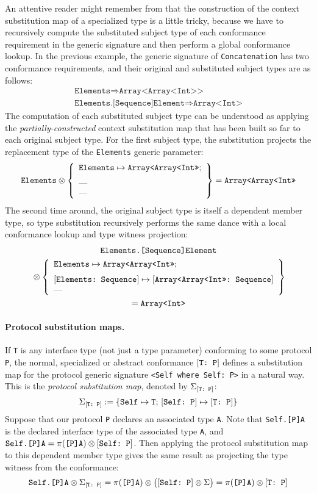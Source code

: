 \documentclass[../generics]{subfiles}
\begin{document}
\begin{example}
An attentive reader might remember from  that the construction of the context substitution map of a specialized type is a little tricky, because we have to recursively compute the substituted subject type of each conformance requirement in the generic signature and then perform a global conformance lookup. In the previous example, the generic signature of \texttt{Concatenation} has two conformance requirements, and their original and substituted subject types are as follows:
\begin{gather*}
\texttt{Elements} \Rightarrow \texttt{Array<Array<Int>>}\\
\texttt{Elements.[Sequence]Element} \Rightarrow \texttt{Array<Int>}
\end{gather*}
The computation of each substituted subject type can be understood as applying the \emph{partially-constructed} context substitution map that has been built so far to each original subject type. For the first subject type, the substitution projects the replacement type of the \texttt{Elements} generic parameter:
\[
\texttt{Elements} \otimes \SubstMapLongC{
\SubstType{Elements}{Array<Array<Int>>}
}{
\text{---}\\
\text{---}
} = \texttt{Array<Array<Int>>}
\]
The second time around, the original subject type is itself a dependent member type, so type substitution recursively performs the same dance with a local conformance lookup and type witness projection:
\begin{gather*}
\texttt{Elements.[Sequence]Element} \\
{} \otimes \SubstMapLongC{
\SubstType{Elements}{Array<Array<Int>>}
}{
\SubstConf{Elements}{Array<Array<Int>>}{Sequence}\\
\text{---}
}\\
= \texttt{Array<Int>}
\end{gather*}
\end{example}

\paragraph{Protocol substitution maps.} If \texttt{T} is any interface type (not just a type parameter) conforming to some protocol \texttt{P}, the normal, specialized or abstract conformance $[\texttt{T:~P}]$ defines a substitution map for the protocol generic signature \verb|<Self where Self: P>| in a natural way. This is the \emph{protocol substitution map}, denoted by $\Sigma_{[\texttt{T:~P}]}$:
\[\Sigma_{[\texttt{T:~P}]} := \{
\texttt{Self} \mapsto \texttt{T}
;\,
[\texttt{Self:~P}] \mapsto [\texttt{T:~P}]
\}\]
Suppose that our protocol \texttt{P} declares an associated type \texttt{A}. Note that \texttt{Self.[P]A} is the declared interface type of the associated type \texttt{A}, and $\texttt{Self.[P]A}=\pi(\texttt{[P]A})\otimes[\texttt{Self:~P}]$. Then applying the protocol substitution map to this dependent member type gives the same result as projecting the type witness from the conformance:
\[\texttt{Self.[P]A}\otimes\Sigma_{[\texttt{T:~P}]}=\pi(\texttt{[P]A})\otimes\bigl([\texttt{Self:~P}]\otimes\Sigma\bigr)=\pi(\texttt{[P]A})\otimes[\texttt{T:~P}]\]
\end{document}
